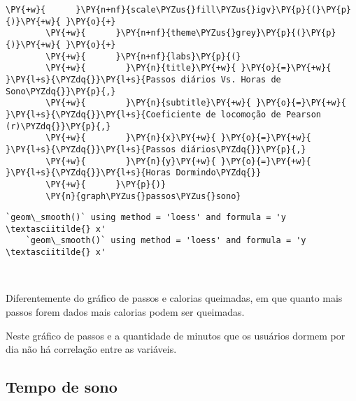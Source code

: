 \begin{tcolorbox}[breakable, size=fbox, boxrule=1pt, pad at break*=1mm,colback=cellbackground, colframe=cellborder]
\begin{Verbatim}[commandchars=\\\{\}]
        \PY{+w}{      }\PY{n+nf}{scale\PYZus{}fill\PYZus{}igv}\PY{p}{(}\PY{p}{)}\PY{+w}{ }\PY{o}{+}
        \PY{+w}{      }\PY{n+nf}{theme\PYZus{}grey}\PY{p}{(}\PY{p}{)}\PY{+w}{ }\PY{o}{+}
        \PY{+w}{      }\PY{n+nf}{labs}\PY{p}{(}
        \PY{+w}{        }\PY{n}{title}\PY{+w}{ }\PY{o}{=}\PY{+w}{ }\PY{l+s}{\PYZdq{}}\PY{l+s}{Passos diários Vs. Horas de Sono\PYZdq{}}\PY{p}{,}
        \PY{+w}{        }\PY{n}{subtitle}\PY{+w}{ }\PY{o}{=}\PY{+w}{ }\PY{l+s}{\PYZdq{}}\PY{l+s}{Coeficiente de locomoção de Pearson (r)\PYZdq{}}\PY{p}{,}
        \PY{+w}{        }\PY{n}{x}\PY{+w}{ }\PY{o}{=}\PY{+w}{ }\PY{l+s}{\PYZdq{}}\PY{l+s}{Passos diários\PYZdq{}}\PY{p}{,}
        \PY{+w}{        }\PY{n}{y}\PY{+w}{ }\PY{o}{=}\PY{+w}{ }\PY{l+s}{\PYZdq{}}\PY{l+s}{Horas Dormindo\PYZdq{}}
        \PY{+w}{      }\PY{p}{)}
        \PY{n}{graph\PYZus{}passos\PYZus{}sono}
    \end{Verbatim}
\end{tcolorbox}

\begin{Verbatim}[commandchars=\\\{\}]
    `geom\_smooth()` using method = 'loess' and formula = 'y \textasciitilde{} x'
    `geom\_smooth()` using method = 'loess' and formula = 'y \textasciitilde{} x'
\end{Verbatim}

\begin{center}
\end{center}
{ \hspace*{\fill} \\}

Diferentemente do gráfico de passos e calorias queimadas, em que quanto
mais passos forem dados mais calorias podem ser queimadas.

Neste gráfico de passos e a quantidade de minutos que os usuários dormem
por dia não há correlação entre as variáveis.

\subsection{Tempo de sono}

